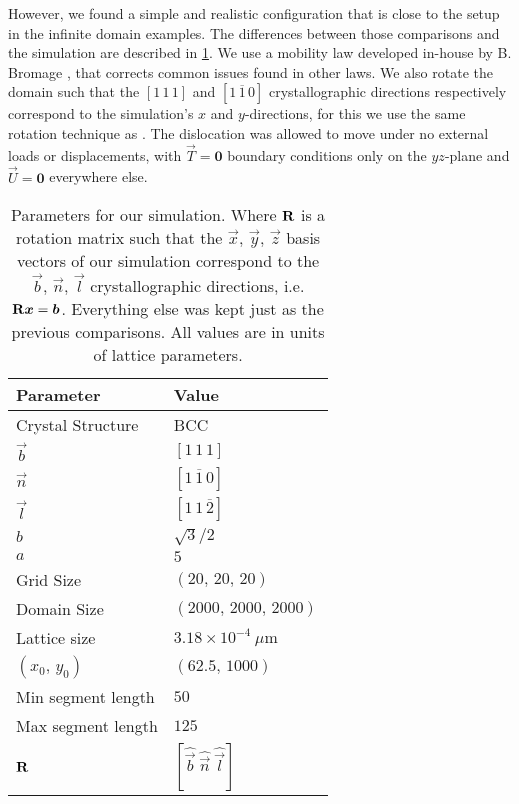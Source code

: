 However, we found a simple and realistic configuration that is close to the setup in the infinite domain examples. The differences between those comparisons and the simulation are described in \cref{t:simulation_params}. We use a mobility law developed in-house by B. Bromage \cite{bromage2018calculating}, that corrects common issues found in other laws. We also rotate the domain such that the $[1\, 1\, 1]$ and $[1\, \overline{1}\, 0]$ crystallographic directions respectively correspond to the simulation's $x$ and $y$-directions, for this we use the same rotation technique as \cite{YU2018}. The dislocation was allowed to move under no external loads or displacements, with $\vec{T} = \bm{0}$ boundary conditions only on the $yz$-plane and $\vec{U} = \bm{0}$ everywhere else.
\begin{table}
    \centering
    \caption[Numeric vs analytic tractions. Unloaded simulation comparison.]{Parameters for our simulation. Where $\mathbf{R}$ is a rotation matrix such that the $\vec{x},\, \vec{y},\, \vec{z}$ basis vectors of our simulation correspond to the $\vec{b},\, \vec{n},\, \vec{l}$ crystallographic directions, i.e. $\mtx{R} \vec{x} = \vec{b}$. Everything else was kept just as the previous comparisons. All values are in units of lattice parameters.}
    \label{t:simulation_params}
    \begin{tabular}{ll}
        \toprule
        Parameter          & Value                                           \\
        \midrule
        Crystal Structure  & BCC                                             \\
        $\vec{b}$          & $[1\, 1\, 1]$                                   \\
        $\vec{n}$          & $[1\, \overline{1}\, 0]$                        \\
        $\vec{l}$          & $[1\, 1\, \overline{2}]$                        \\
        $b$                & $\sqrt{3}/2$                                    \\
        $a$                & $5\, $                                          \\
        Grid Size          & $(20,\, 20,\, 20)$                              \\
        Domain Size        & $(2000,\, 2000,\, 2000)\, $                     \\
        Lattice size       & $3.18\times 10^{-4}~\mu\text{m}$                \\
        $(x_{0},\, y_{0})$ & $(62.5,\, 1000)\, $                             \\
        Min segment length & $50\, $                                         \\
        Max segment length & $125\, $                                        \\
        $\mathbf{R}$          & $[\hat{\vec{b}}~ \hat{\vec{n}}~ \hat{\vec{l}}]$ \\
        \bottomrule
    \end{tabular}
\end{table}

